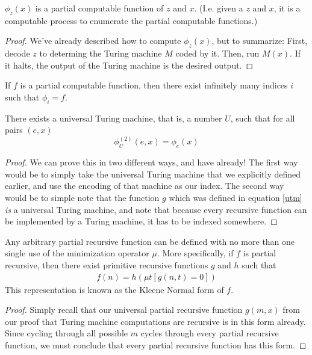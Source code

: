 \begin{theorem}
    $\phi_z(x)$ is a partial computable function of $z$ and $x$. (I.e. given a $z$ and $x$, it is a computable process to enumerate the partial computable functions.)
\end{theorem}
\begin{proof}
    We've already described how to compute $\phi_z(x)$, but to summarize: First, decode $z$ to determing the Turing machine $M$ coded by it. Then, run $M(x)$. If it halts, the output of the Turing machine is the desired output.
\end{proof}
\begin{lemma}
    If $f$ is a partial computable function, then there exist infinitely many indices $i$ such that $\phi_i = f$.
\end{lemma}
\begin{theorem}
    There exists a universal Turing machine, that is, a number $U$, such that for all pairs $(e,x)$
    \[ \phi_U^{(2)}(e,x) = \phi_e(x) \] 
\end{theorem}
\begin{proof}
    We can prove this in two different ways, and have already! The first way would be to simply take the universal Turing machine that we explicitly defined earlier, and use the encoding of that machine as our index. The second way would be to simple note that the function $g$ which was defined in equation \ref{utm} \textit{is} a universal Turing machine, and note that because every recursive function can be implemented by a Turing machine, it has to be indexed somewhere.
\end{proof}
\begin{theorem}
    Any arbitrary partial recursive function can be defined with no more than one single use of the minimization operator $\mu$. More specifically, if $f$ is partial recursive, then there exist primitive recursive functions $g$ and $h$ such that
    \begin{align}
        f(n) = h(\mu t [g(n,t) = 0])
    \end{align}
    This representation is known as the Kleene Normal form of $f$. 
\end{theorem}
\begin{proof}
    Simply recall that our universal partial recursive function $g(m,x)$ from our proof that Turing machine computations are recursive is in this form already. Since cycling through all possible $m$ cycles through every partial recursive function, we must conclude that every partial recursive function has this form.
\end{proof}
